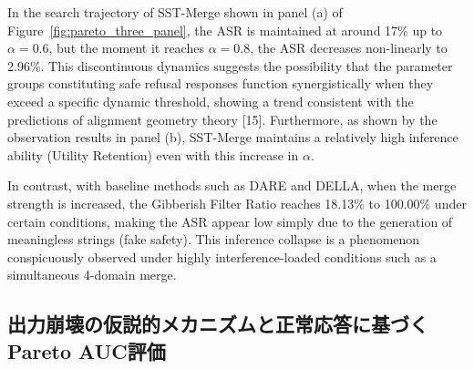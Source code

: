 \documentclass{article}
\begin{document}
In the search trajectory of SST-Merge shown in panel (a) of Figure~\ref{fig:pareto_three_panel}, the ASR is maintained at around 17\% up to $\alpha=0.6$, but the moment it reaches $\alpha=0.8$, the ASR decreases non-linearly to 2.96\%. This discontinuous dynamics suggests the possibility that the parameter groups constituting safe refusal responses function synergistically when they exceed a specific dynamic threshold, showing a trend consistent with the predictions of alignment geometry theory [15]. Furthermore, as shown by the observation results in panel (b), SST-Merge maintains a relatively high inference ability (Utility Retention) even with this increase in $\alpha$.

In contrast, with baseline methods such as DARE and DELLA, when the merge strength is increased, the Gibberish Filter Ratio reaches 18.13\% to 100.00\% under certain conditions, making the ASR appear low simply due to the generation of meaningless strings (fake safety). This inference collapse is a phenomenon conspicuously observed under highly interference-loaded conditions such as a simultaneous 4-domain merge.

\subsection{出力崩壊の仮説的メカニズムと正常応答に基づくPareto AUC評価}
\end{document}

